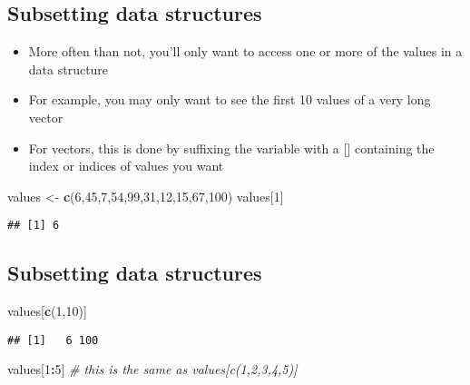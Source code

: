 \documentclass[]{article}
\newenvironment{Shaded}{\begin{snugshade}}{\end{snugshade}}
\newcommand{\KeywordTok}[1]{\textcolor[rgb]{0.13,0.29,0.53}{\textbf{#1}}}
\newcommand{\DecValTok}[1]{\textcolor[rgb]{0.00,0.00,0.81}{#1}}
\newcommand{\StringTok}[1]{\textcolor[rgb]{0.31,0.60,0.02}{#1}}
\newcommand{\CommentTok}[1]{\textcolor[rgb]{0.56,0.35,0.01}{\textit{#1}}}
\newcommand{\OperatorTok}[1]{\textcolor[rgb]{0.81,0.36,0.00}{\textbf{#1}}}
\newcommand{\NormalTok}[1]{#1}
\providecommand{\tightlist}{%
  \setlength{\itemsep}{0pt}\setlength{\parskip}{0pt}}
\begin{document}
\subsection{Subsetting data
structures}\label{subsetting-data-structures}

\begin{itemize}
\tightlist
\item
  More often than not, you'll only want to access one or more of the
  values in a data structure
\item
  For example, you may only want to see the first 10 values of a very
  long vector
\item
  For vectors, this is done by suffixing the variable with a {[}{]}
  containing the index or indices of values you want
\end{itemize}

\begin{Shaded}
\begin{Highlighting}[]
\NormalTok{values <-}\StringTok{ }\KeywordTok{c}\NormalTok{(}\DecValTok{6}\NormalTok{,}\DecValTok{45}\NormalTok{,}\DecValTok{7}\NormalTok{,}\DecValTok{54}\NormalTok{,}\DecValTok{99}\NormalTok{,}\DecValTok{31}\NormalTok{,}\DecValTok{12}\NormalTok{,}\DecValTok{15}\NormalTok{,}\DecValTok{67}\NormalTok{,}\DecValTok{100}\NormalTok{)}
\NormalTok{values[}\DecValTok{1}\NormalTok{]}
\end{Highlighting}
\end{Shaded}

\begin{verbatim}
## [1] 6
\end{verbatim}

\subsection{Subsetting data
structures}\label{subsetting-data-structures-1}

\begin{Shaded}
\begin{Highlighting}[]
\NormalTok{values[}\KeywordTok{c}\NormalTok{(}\DecValTok{1}\NormalTok{,}\DecValTok{10}\NormalTok{)]}
\end{Highlighting}
\end{Shaded}

\begin{verbatim}
## [1]   6 100
\end{verbatim}

\begin{Shaded}
\begin{Highlighting}[]
\NormalTok{values[}\DecValTok{1}\OperatorTok{:}\DecValTok{5}\NormalTok{] }\CommentTok{# this is the same as values[c(1,2,3,4,5)]}
\end{Highlighting}
\end{Shaded}
\end{document}
